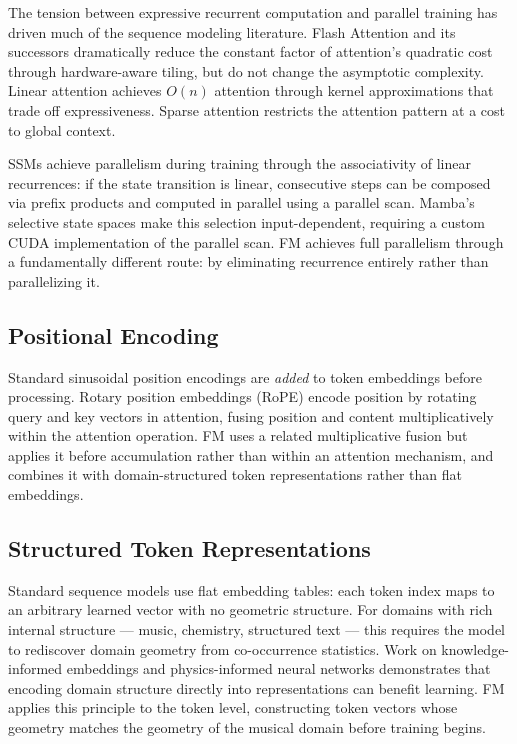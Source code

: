 \documentclass[11pt]{article}
\begin{document}
The tension between expressive recurrent computation and parallel training has driven much of the sequence modeling literature. Flash Attention \cite{dao2022flashattention} and its successors dramatically reduce the constant factor of attention's quadratic cost through hardware-aware tiling, but do not change the asymptotic complexity. Linear attention \cite{katharopoulos2020transformers} achieves $O(n)$ attention through kernel approximations that trade off expressiveness. Sparse attention \cite{child2019generating} restricts the attention pattern at a cost to global context.

SSMs achieve parallelism during training through the associativity of linear recurrences: if the state transition is linear, consecutive steps can be composed via prefix products and computed in parallel using a parallel scan. Mamba's selective state spaces make this selection input-dependent, requiring a custom CUDA implementation of the parallel scan. FM achieves full parallelism through a fundamentally different route: by eliminating recurrence entirely rather than parallelizing it.

\subsection{Positional Encoding}

Standard sinusoidal position encodings \cite{vaswani2017attention} are \textit{added} to token embeddings before processing. Rotary position embeddings (RoPE) \cite{su2022roformer} encode position by rotating query and key vectors in attention, fusing position and content multiplicatively within the attention operation. FM uses a related multiplicative fusion but applies it before accumulation rather than within an attention mechanism, and combines it with domain-structured token representations rather than flat embeddings.

\subsection{Structured Token Representations}

Standard sequence models use flat embedding tables: each token index maps to an arbitrary learned vector with no geometric structure. For domains with rich internal structure — music, chemistry, structured text — this requires the model to rediscover domain geometry from co-occurrence statistics. Work on knowledge-informed embeddings \cite{hamilton2017embedding} and physics-informed neural networks \cite{raissi2019physics} demonstrates that encoding domain structure directly into representations can benefit learning. FM applies this principle to the token level, constructing token vectors whose geometry matches the geometry of the musical domain before training begins.
\end{document}
